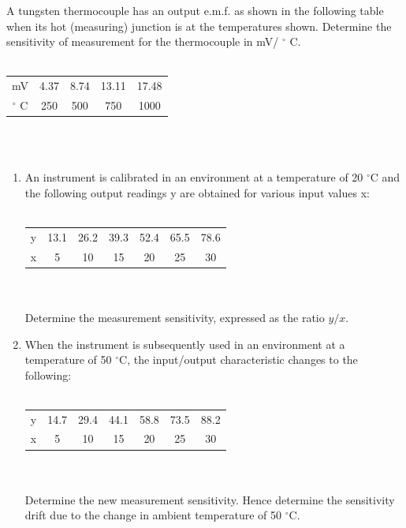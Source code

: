 \documentclass[a4paper,11pt]{book}
\begin{document}
\begin{question}
A tungsten thermocouple has an output e.m.f. as shown in the following table when its hot
(measuring) junction is at the temperatures shown. Determine the sensitivity of measurement
for the thermocouple in mV/ $^{\circ}$ C.
\\ \\

\begin{tabular}{ccccc}
\hline 
mV & 4.37 & 8.74 & 13.11 & 17.48 \\ 
$^{\circ}$ C & 250 & 500 & 750 & 1000 \\ 
\hline 
\end{tabular}  \\ \\

\examspace*{5em}

\end{question}
\begin{solution}


\end{solution}



\begin{question}
\begin{enumerate}
\item An instrument is calibrated in an environment at a temperature of 20 $^{\circ}$C and the following
output readings y are obtained for various input values x: \\ \\
\begin{tabular}{ccccccc}
\hline 
y & 13.1 & 26.2 & 39.3 & 52.4 & 65.5 & 78.6 \\ 
x & 5 & 10 & 15 & 20 & 25 & 30 \\ 
\hline 
\end{tabular}  \\ \\
Determine the measurement sensitivity, expressed as the ratio $y/x$.

\item When the instrument is subsequently used in an environment at a temperature of 50 $^{\circ}$C,
the input/output characteristic changes to the following: \\ \\ 
\begin{tabular}{ccccccc}
\hline 
y & 14.7 & 29.4 & 44.1 & 58.8 & 73.5 & 88.2 \\ 
x & 5 & 10 & 15 & 20 & 25 & 30 \\ 
\hline 
\end{tabular}  \\ \\
Determine the new measurement sensitivity. Hence determine the sensitivity drift due to
the change in ambient temperature of 50 $^{\circ}$C.
\end{enumerate}

\examspace*{5em}

\end{question}
\begin{solution}

\end{solution}
\end{document}
